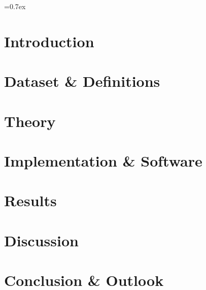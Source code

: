 


	
	\font=0.7ex%

	
	\tableofcontents
	\thispagestyle{empty}
	
	\pagestyle{fancy}
	\fancyhf{}
	\cfoot{\thepage}
	
	\newpage
	\section{Introduction}
	
	
	\section{Dataset \& Definitions}\label{sec:dataset_definitions}
	
	
	\section{Theory}\label{sec:theory}
	
	
	\section{Implementation \& Software}\label{sec:implementation_software}
	
	
	\section{Results}\label{sec:results}
	
	
	\section{Discussion}\label{sec:discussion}
	
	
	\section{Conclusion \& Outlook}\label{sec:conclusion_outlook}
	

	\newpage
	\printbibliography
	
